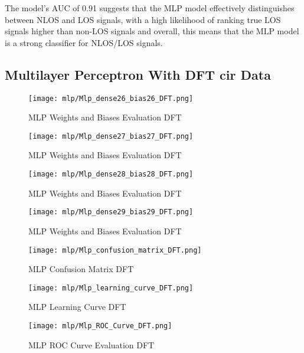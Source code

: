 The model's AUC of 0.91 suggests that the MLP model effectively distinguishes between NLOS and LOS signals, with a high likelihood of ranking true LOS signals higher than non-LOS signals and overall, this means that the MLP model is a strong classifier for NLOS/LOS signals.
\subsection{Multilayer Perceptron With DFT \gls{cir} Data}\label{mlp_visual_dft}

\begin{figure}[H] 
  \centering
  \texttt{[image: mlp/Mlp\_dense26\_bias26\_DFT.png]}
  \caption{MLP Weights and Biases Evaluation DFT}\label{fig:Mlp_dense26_bias26_DFT}
\end{figure}

\begin{figure}[H] 
  \centering
  \texttt{[image: mlp/Mlp\_dense27\_bias27\_DFT.png]}
  \caption{MLP Weights and Biases Evaluation DFT}\label{fig:Mlp_dense27_bias27_DFTMlp_dense27_bias27_DFT}
\end{figure}

\begin{figure}[H] 
  \centering
  \texttt{[image: mlp/Mlp\_dense28\_bias28\_DFT.png]}
  \caption{MLP Weights and Biases Evaluation DFT}\label{fig:Mlp_dense28_bias28_DFT}
\end{figure}

\begin{figure}[H] 
  \centering
  \texttt{[image: mlp/Mlp\_dense29\_bias29\_DFT.png]}
  \caption{MLP Weights and Biases Evaluation DFT}\label{fig:Mlp_dense29_bias29_DFT}
\end{figure}


\begin{figure}[H] 
  \centering
  \texttt{[image: mlp/Mlp\_confusion\_matrix\_DFT.png]}
  \caption{MLP Confusion Matrix DFT}\label{fig:Mlp_confusion_matrix_DFT}
\end{figure}


\begin{figure}[H] 
  \centering
  \texttt{[image: mlp/Mlp\_learning\_curve\_DFT.png]}
  \caption{MLP Learning Curve DFT}\label{fig:Mlp_learning_curve_DFT}
\end{figure}


\begin{figure}[H] 
  \centering
  \texttt{[image: mlp/Mlp\_ROC\_Curve\_DFT.png]}
  \caption{MLP ROC Curve Evaluation DFT}\label{fig:Mlp_ROC_Curve_DFT}
\end{figure}

